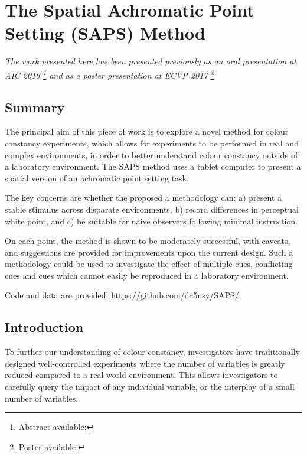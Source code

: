 \chapter{The Spatial Achromatic Point Setting (SAPS) Method}
\label{TabletMethodChapter}

\textit{The work presented here has been presented previously as an oral presentation at AIC 2016 \citep[p. 125]{garside_estimating_2016}\footnote{Abstract available: } and as a poster presentation at ECVP 2017 \citep[p. 93]{niko_busch_european_2017}\footnote{Poster available: }}

\section{Summary}

The principal aim of this piece of work is to explore a novel method for colour constancy experiments, which allows for experiments to be performed in real and complex environments, in order to better understand colour constancy outside of a laboratory environment. The \gls{SAPS} method uses a tablet computer to present a spatial version of an achromatic point setting task. 

The key concerns are whether the proposed a methodology can: a) present a stable stimulus across disparate environments, b) record differences in perceptual white point, and c) be suitable for naive observers following minimal instruction. 

On each point, the method is shown to be moderately successful, with caveats, and suggestions are provided for improvements upon the current design. Such a methodology could be used to investigate the effect of multiple cues, conflicting cues and cues which cannot easily be reproduced in a laboratory environment.

Code and data are provided: \url{https://github.com/da5nsy/SAPS/}.

\newpage

\section{Introduction}

To further our understanding of colour constancy, investigators have traditionally designed well-controlled experiments where the number of variables is greatly reduced compared to a real-world environment. This allows investigators to carefully query the impact of any individual variable, or the interplay of a small number of variables. 

